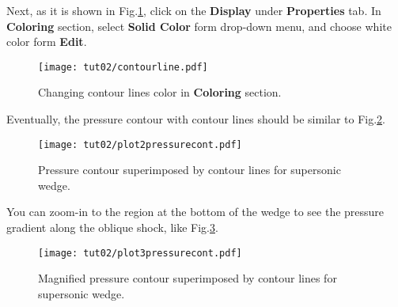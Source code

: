 Next, as it is shown in Fig.\ref{fig2:colorby2}, click on the \textbf{Display} under \textbf{Properties} tab. In \textbf{Coloring} section, select \textbf{Solid Color} form drop-down menu, and choose white color form \textbf{Edit}.
\begin{figure}[htbp]
    \centering
    \texttt{[image: tut02/contourline.pdf]}
    \caption{Changing contour lines color in \textbf{Coloring} section.}
    \label{fig2:colorby2}
\end{figure}
Eventually, the pressure contour with contour lines should be similar to Fig.\ref{fig2:pressure_contour_lines}.
\begin{figure}[htbp]
    \centering
    \texttt{[image: tut02/plot2pressurecont.pdf]}
    \caption{Pressure contour superimposed by contour lines for supersonic wedge.}
    \label{fig2:pressure_contour_lines}
\end{figure}
You can zoom-in to the region at the bottom of the wedge to see the pressure gradient along the oblique
shock, like Fig.\ref{fig2:pressure_contour_lines_zoom}.
\begin{figure}[htbp]
    \centering
    \texttt{[image: tut02/plot3pressurecont.pdf]}
    \caption{Magnified pressure contour superimposed by contour lines for supersonic wedge.}
    \label{fig2:pressure_contour_lines_zoom}
\end{figure}


